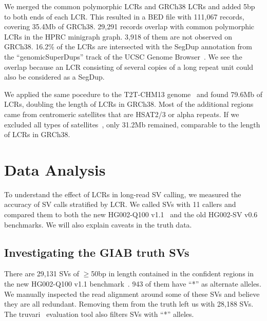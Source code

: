 \documentclass[a4paper,num-refs]{oup-contemporary}
\begin{document}
We merged the common polymorphic LCRs and GRCh38 LCRs and added 5bp to both ends of each LCR.
This resulted in a BED file with 111,067 records, covering 35.4Mb of GRCh38.
29,291 records overlap with common polymorphic LCRs in the HPRC minigraph graph.
3,918 of them are not observed on GRCh38.
16.2\% of the LCRs are intersected with the SegDup annotation from the ``genomicSuperDups'' track of the UCSC Genome Browser~\cite{Perez:2025aa}.
We see the overlap because an LCR consisting of several copies of a long repeat unit could also be considered as a SegDup.

We applied the same pocedure to the T2T-CHM13 genome~\cite{Nurk:2022up}
and found 79.6Mb of LCRs, doubling the length of LCRs in GRCh38.
Most of the additional regions came from centromeric satellites that are HSAT2/3 or alpha repeats.
If we excluded all types of satellites~\cite{Altemose:2022tv}, only 31.2Mb remained,
comparable to the length of LCRs in GRCh38.

\section{Data Analysis}

To understand the effect of LCRs in long-read SV calling,
we measured the accuracy of SV calls stratified by LCR.
We called SVs with 11 callers and compared them to both the new HG002-Q100 v1.1~\cite{Hansen2025.09.21.677443}
and the old HG002-SV v0.6~\cite{Zook:2020aa} benchmarks.
We will also explain caveats in the truth data.

\subsection{Investigating the GIAB truth SVs}

There are 29,131 SVs of $\ge$50bp in length contained in the confident regions in the new HG002-Q100 v1.1 benchmark~\cite{Hansen2025.09.21.677443}.
943 of them have ``*'' as alternate alleles.
We manually inspected the read alignment around some of these SVs and believe they are all redundant.
Removing them from the truth left us with 28,188 SVs.
The truvari~\cite{English:2022aa} evaluation tool also filters SVs with ``*'' alleles.
\end{document}
